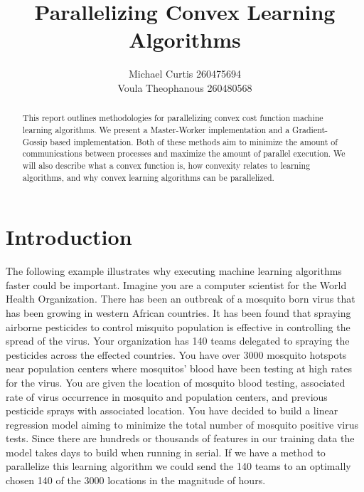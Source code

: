 \documentclass{article}
\theoremstyle{definition}
\begin{document}
\title{Parallelizing Convex Learning Algorithms}
\author{Michael Curtis 260475694\\
Voula Theophanous 260480568}
\maketitle

\begin{abstract}

This report outlines methodologies for parallelizing convex cost function machine learning algorithms. We present a Master-Worker implementation and a Gradient-Gossip based implementation. Both of these methods aim to minimize the amount of communications between processes and maximize the amount of parallel execution. We will also describe what a convex function is, how convexity relates to learning algorithms, and why convex learning algorithms can be parallelized.

\end{abstract}

\section{Introduction}
The following example illustrates why executing machine learning algorithms faster could be important. Imagine you are a computer scientist for the World Health Organization. There has been an outbreak of a mosquito born virus that has been growing in western African countries. It has been found that spraying airborne pesticides to control misquito population is effective in controlling the spread of the virus. Your organization has 140 teams delegated to spraying the pesticides across the effected countries. You have over 3000 mosquito hotspots near population centers where mosquitos' blood have been testing at high rates for the virus. You are given the location of mosquito blood testing, associated rate of virus occurrence in mosquito and population centers, and previous pesticide sprays with associated location. You have decided to build a linear regression model aiming to minimize the total number of mosquito positive virus tests. Since there are hundreds or thousands of features in our training data the model takes days to build when running in serial. If we have a method to parallelize this learning algorithm we could send the 140 teams to an optimally chosen 140 of the 3000 locations in the magnitude of hours.
\end{document}
